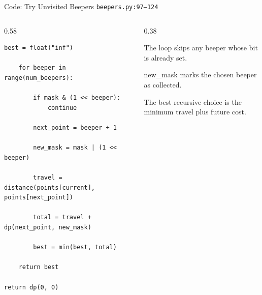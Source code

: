 \documentclass[aspectratio=169,11pt]{beamer}
\begin{document}
\begin{frame}[fragile]{Code: Try Unvisited Beepers}
\scriptsize
{} \texttt{beepers.py:97--124}

\vspace{0.08cm}
\begin{columns}[T,totalwidth=\textwidth]
\begin{column}{0.58\textwidth}
\begin{lstlisting}[style=cpcode]
    best = float("inf")

    for beeper in range(num_beepers):

        if mask & (1 << beeper):
            continue

        next_point = beeper + 1

        new_mask = mask | (1 << beeper)

        travel = distance(points[current], points[next_point])

        total = travel + dp(next_point, new_mask)

        best = min(best, total)

    return best

return dp(0, 0)
\end{lstlisting}
\end{column}
\begin{column}{0.38\textwidth}
\begin{tightitemize}
  \item The loop skips any beeper whose bit is already set.
  \item new\_mask marks the chosen beeper as collected.
  \item The best recursive choice is the minimum travel plus future cost.
\end{tightitemize}
\end{column}
\end{columns}
\end{frame}
\end{document}
